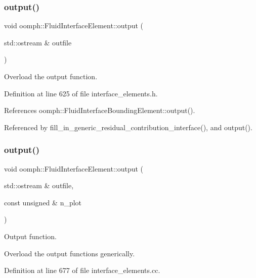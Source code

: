 \subsubsection{\texorpdfstring{output()}{output()}\hspace{0.1cm}{\footnotesize\ttfamily [1/4]}}
{\footnotesize\ttfamily void oomph\+::\+Fluid\+Interface\+Element\+::output (\begin{DoxyParamCaption}\item[{std\+::ostream \&}]{outfile }\end{DoxyParamCaption})\hspace{0.3cm}{\ttfamily [inline]}}



Overload the output function. 



Definition at line 625 of file interface\+\_\+elements.\+h.



References oomph\+::\+Fluid\+Interface\+Bounding\+Element\+::output().



Referenced by fill\+\_\+in\+\_\+generic\+\_\+residual\+\_\+contribution\+\_\+interface(), and output().

\mbox{\label{classoomph_1_1FluidInterfaceElement_a213b1a40132a9605ee8bd31c88b225e0}} 
\subsubsection{\texorpdfstring{output()}{output()}\hspace{0.1cm}{\footnotesize\ttfamily [2/4]}}
{\footnotesize\ttfamily void oomph\+::\+Fluid\+Interface\+Element\+::output (\begin{DoxyParamCaption}\item[{std\+::ostream \&}]{outfile,  }\item[{const unsigned \&}]{n\+\_\+plot }\end{DoxyParamCaption})}



Output function. 

Overload the output functions generically. 

Definition at line 677 of file interface\+\_\+elements.\+cc.



